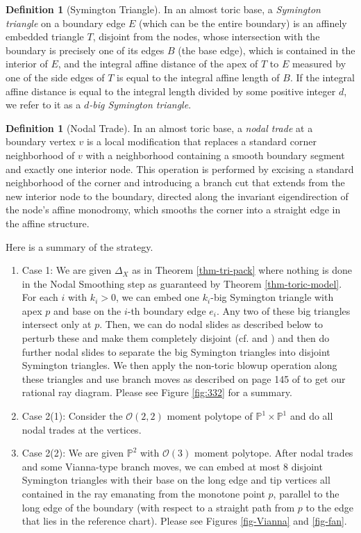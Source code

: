 \documentclass[11pt, reqno]{amsart}
\theoremstyle{definition}
\newtheorem{definition}[theorem]{Definition}
\begin{document}
\begin{definition}[Symington Triangle]
In an almost toric base, a \emph{Symington triangle} on a boundary edge $E$ (which can be the entire boundary) is an affinely embedded triangle $T$, disjoint from the nodes, whose intersection with the boundary is precisely one of its edges $B$ (the base edge), which is contained in the interior of $E$, and the integral affine distance of the apex of $T$ to $E$ measured by one of the side edges of $T$ is equal to the integral affine length of $B.$ If the integral affine distance is equal to the integral length divided by some positive integer $d$, we refer to it as a \emph{$d$-big Symington triangle}.
\end{definition}
\begin{definition}[Nodal Trade]
In an almost toric base, a \emph{nodal trade} at a boundary vertex $v$ is a local modification that replaces a standard corner neighborhood of $v$ with a neighborhood containing a smooth boundary segment and exactly one interior node. This operation is performed by excising a standard neighborhood of the corner and introducing a branch cut that extends from the new interior node to the boundary, directed along the invariant eigendirection of the node's affine monodromy, which smooths the corner into a straight edge in the affine structure.
\end{definition}

Here is a summary of the strategy.

\begin{enumerate}
    \item Case 1: We are given $\Delta_X$ as in Theorem \ref{thm-tri-pack} where nothing is done in the Nodal Smoothing step as guaranteed by Theorem \ref{thm-toric-model}. For each $i$ with $k_i>0$, we can embed one $k_i$-big
Symington triangle with apex $p$ and base on the $i$-th boundary
edge $e_i$. Any two of these big triangles intersect only at $p$. Then, we can do nodal slides as described below to perturb these and make them completely disjoint (cf. \cite[Lemma 32]{LMN23} and \cite[Proposition 5.6]{EF21}) and then do further nodal slides to separate the big Symington triangles into disjoint Symington triangles. We then apply the non-toric blowup operation along these triangles and use branch moves as described on page 145 of \cite{Eva23} to get our rational ray diagram. Please see Figure \ref{fig:332} for a summary. 
    \item Case 2(1): Consider  the $\mathcal{O}(2,2)$ moment polytope of $\mathbb{P}^1\times \mathbb{P}^1$ and do all nodal trades at the vertices.
    \item Case 2(2): We are given $\mathbb{P}^2$ with $\mathcal{O}(3)$  moment polytope. After nodal trades and some Vianna-type branch moves, we can embed at most $8$ disjoint Symington triangles with their base on the long edge and tip vertices all contained in the ray emanating from the monotone point $p$, parallel to the long edge of the boundary (with respect to a straight path from $p$ to the edge that lies in the reference chart). Please see Figures \ref{fig-Vianna} and \ref{fig-fan}.
\end{enumerate}
\end{document}
